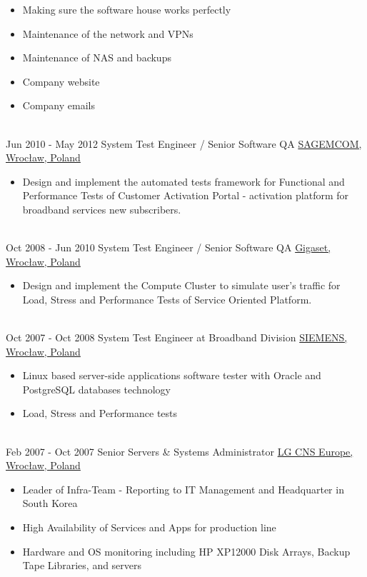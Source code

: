\documentclass[letterpaper]{tenseconds} %
\begin{document}
\begin{twenty}
{\begin{itemize}
		\item Making sure the software house works perfectly
		\item Maintenance of the network and VPNs
		\item Maintenance of NAS and backups
		\item Company website
		\item Company emails
		\end{itemize}}
	\\
	\twentyitem
	{Jun 2010 -}
	{May 2012}
	{System Test Engineer / Senior Software QA}
	{\href{https://www.sagemcom.com/}{SAGEMCOM, Wrocław, Poland}}
	{}
	{\begin{itemize}
		\item Design and implement the automated tests framework for Functional and Performance Tests of Customer Activation Portal - activation platform for broadband services new subscribers.
		\end{itemize}}
	\\
	\twentyitem
	{Oct 2008 -}
	{Jun 2010}
	{System Test Engineer / Senior Software QA}
	{\href{https://www.gigaset.com/}{Gigaset, Wrocław, Poland}}
	{}
	{\begin{itemize}
		\item Design and implement the Compute Cluster to simulate user's traffic for Load, Stress and Performance Tests of Service Oriented Platform.
		\end{itemize}}
	\\
	\twentyitem
	{Oct 2007 -}
	{Oct 2008}
	{System Test Engineer at Broadband Division}
	{\href{https://www.siemens.com/}{SIEMENS, Wrocław, Poland}}
	{}
	{
		{\begin{itemize}
			\item Linux based server-side applications software tester with Oracle and PostgreSQL databases technology
			\item Load, Stress and Performance tests
			\end{itemize}}
	}
	\\   
	\twentyitem
	{Feb 2007 -}
	{Oct 2007}
	{Senior Servers \& Systems Administrator}
	{\href{https://www.lgcns.com}{LG CNS Europe, Wrocław, Poland}}
	{}
	{
		{\begin{itemize}
			\item Leader of Infra-Team - Reporting to IT Management and Headquarter in South Korea
			\item High Availability of Services and Apps for production line
			\item Hardware and OS monitoring including HP XP12000 Disk Arrays, Backup Tape Libraries, and servers

\end{itemize}}}
\end{twenty}
\end{document}

